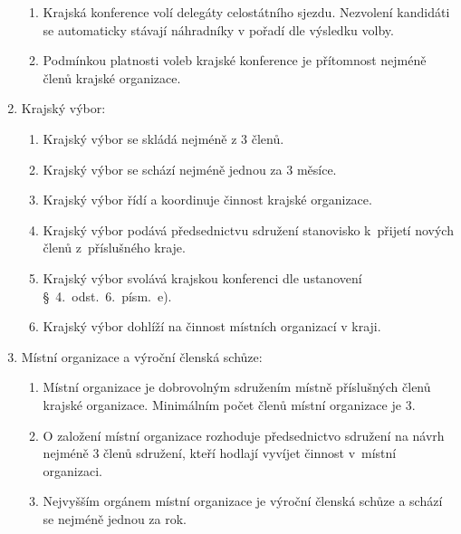 \documentclass[a4paper]{article}
\begin{document}
\begin{enumerate}
\begin{enumerate}
        \item Krajská konference volí delegáty celostátního sjezdu. Nezvolení
            kandidáti se automaticky stávají náhradníky v pořadí dle výsledku
            volby.

        \item Podmínkou platnosti voleb krajské konference je přítomnost
            nejméně  členů krajské organizace.
        \end{enumerate}

    \item Krajský výbor:
        \begin{enumerate}
        \item Krajský výbor se skládá nejméně z 3 členů.

        \item Krajský výbor se schází nejméně jednou za 3 měsíce.

        \item Krajský výbor řídí a koordinuje činnost krajské organizace.

        \item Krajský výbor podává předsednictvu sdružení stanovisko k~přijetí
            nových členů z~příslušného kraje.

        \item Krajský výbor svolává krajskou konferenci dle ustanovení
            \S~4.~odst.~6.~písm.~e).

        \item Krajský výbor dohlíží na činnost místních organizací v kraji.
        \end{enumerate}

    \item Místní organizace a výroční členská schůze:
        \begin{enumerate}
        \item Místní organizace je dobrovolným sdružením místně příslušných
            členů krajské organizace. Minimálním počet členů místní organizace
            je 3.

        \item O založení místní organizace rozhoduje předsednictvo sdružení na
            návrh nejméně 3 členů sdružení, kteří hodlají vyvíjet činnost
            v~místní organizaci.

        \item Nejvyšším orgánem místní organizace je výroční členská schůze a
            schází se nejméně jednou za rok.


\end{enumerate}
\end{enumerate}
\end{document}
